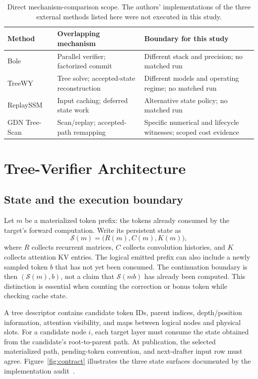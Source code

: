 \documentclass[conference]{IEEEtran}
\newcommand{\sys}{GDN Tree-Scan}
\begin{document}
\begin{table}[t]
\caption{Direct mechanism-comparison scope. The authors' implementations of the three external methods listed here were not executed in this study.}
\label{tab:related}
\centering\footnotesize
\begin{tabularx}{\columnwidth}{@{}>{\raggedright\arraybackslash}p{}YY@{}}
\toprule
Method & Overlapping mechanism & Boundary for this study \\
\midrule
Bole~\cite{wang2026bole} & Parallel verifier; factorized commit & Different stack and precision; no matched run \\
TreeWY~\cite{ghantasala2026treewy} & Tree solve; accepted-state reconstruction & Different models and operating regime; no matched run \\
ReplaySSM~\cite{replayssm2026} & Input caching; deferred state work & Alternative state policy; no matched run \\
\sys{} & Scan/replay; accepted-path remapping & Specific numerical and lifecycle witnesses; scoped cost evidence \\
\bottomrule
\end{tabularx}
\end{table}

\section{Tree-Verifier Architecture}
\label{sec:contract}
\subsection{State and the execution boundary}
Let $m$ be a materialized token prefix: the tokens already consumed by the target's forward computation. Write its persistent state as
\begin{equation}
\mathcal{S}(m)=\bigl(R(m),C(m),K(m)\bigr),
\end{equation}
where $R$ collects recurrent matrices, $C$ collects convolution histories, and $K$ collects attention KV entries. The logical emitted prefix can also include a newly sampled token $b$ that has not yet been consumed. The continuation boundary is then $(\mathcal{S}(m),b)$, not a claim that $\mathcal{S}(mb)$ has already been computed. This distinction is essential when counting the correction or bonus token while checking cache state.

A tree descriptor contains candidate token IDs, parent indices, depth/position information, attention visibility, and maps between logical nodes and physical slots. For a candidate node $i$, each target layer must consume the state obtained from the candidate's root-to-parent path. At publication, the selected materialized path, pending-token convention, and next-drafter input row must agree. Figure~\ref{fig:contract} illustrates the three state surfaces documented by the implementation audit~\cite{lumo2026stateless,lumo2026archive}.
\end{document}
